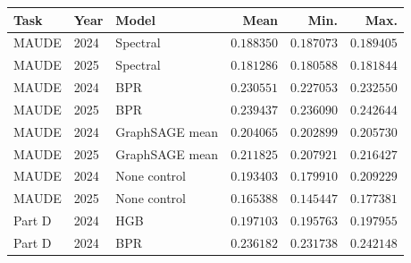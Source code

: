 \begin{tabularx}{\linewidth}{@{}llXrrr@{}}
\toprule
Task & Year & Model & Mean & Min. & Max. \\
\midrule
MAUDE & 2024 & Spectral & $0.188350$ & $0.187073$ & $0.189405$ \\
MAUDE & 2025 & Spectral & $0.181286$ & $0.180588$ & $0.181844$ \\
MAUDE & 2024 & BPR & $0.230551$ & $0.227053$ & $0.232550$ \\
MAUDE & 2025 & BPR & $0.239437$ & $0.236090$ & $0.242644$ \\
MAUDE & 2024 & GraphSAGE mean & $0.204065$ & $0.202899$ & $0.205730$ \\
MAUDE & 2025 & GraphSAGE mean & $0.211825$ & $0.207921$ & $0.216427$ \\
MAUDE & 2024 & None control & $0.193403$ & $0.179910$ & $0.209229$ \\
MAUDE & 2025 & None control & $0.165388$ & $0.145447$ & $0.177381$ \\
Part D & 2024 & HGB & $0.197103$ & $0.195763$ & $0.197955$ \\
Part D & 2024 & BPR & $0.236182$ & $0.231738$ & $0.242148$ \\
\bottomrule
\end{tabularx}
